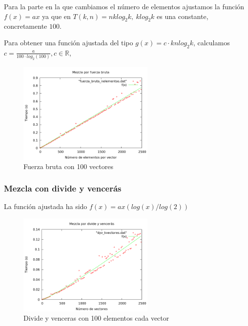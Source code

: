 \newpage
Para la parte en la que cambiamos el n\'umero de elementos ajustamos la funci\'on 
$f(x) = ax$ ya 	que en $T(k, n) = nklog_2k, \ klog_2k$ es una constante, concretamente $100$.

\begin{center}
\end{center}

Para obtener una funci\'on ajustada del tipo $g(x)=c\cdot knlog_2k$, calculamos $c=\frac{a}{100\cdot log_2(100)}, c \in \mathbb{R}$,

\begin{figure}[htb] 
\centering
	\includegraphics[width=0.6\textwidth]{../Obligatorio/Graficas/fuerza_bruta_nelementos.png}
	\caption{Fuerza bruta con 100 vectores} 
	\label{fig:f_nelementos} 
\end{figure}
\newpage


\subsubsection{Mezcla con divide y vencer\'as}
La funci\'on ajustada ha sido $f(x) = ax(log(x)/log(2))$

\begin{center}
\end{center}

\begin{figure}[htb] 
\centering
	\includegraphics[width=0.6\textwidth]{../Obligatorio/Graficas/dyv_kvectores.png}
	\caption{Divide y venceras con 100 elementos cada vector} 
	\label{fig:d_kvectores} 
\end{figure}

